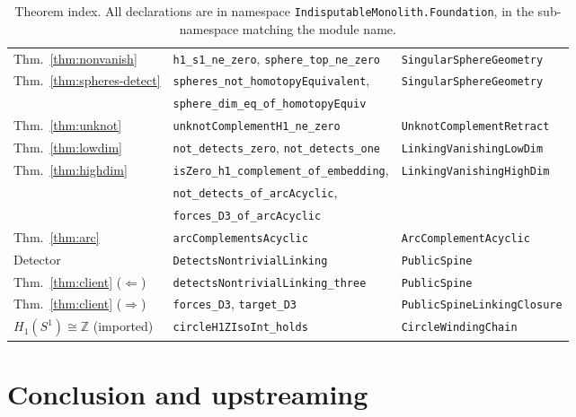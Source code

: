\documentclass[11pt]{article}
\theoremstyle{remark}
\newcommand{\Z}{\mathbb{Z}}
\newcommand{\leanname}[1]{\texttt{#1}}
\begin{document}
\begin{table}[ht]
\begin{tabular}{@{}lll@{}}
Thm.~\ref{thm:nonvanish} & \leanname{h1\_s1\_ne\_zero}, \leanname{sphere\_top\_ne\_zero} & \leanname{SingularSphereGeometry} \\
Thm.~\ref{thm:spheres-detect} & \leanname{spheres\_not\_homotopyEquivalent}, & \leanname{SingularSphereGeometry} \\
 & \leanname{sphere\_dim\_eq\_of\_homotopyEquiv} & \\
Thm.~\ref{thm:unknot} & \leanname{unknotComplementH1\_ne\_zero} & \leanname{UnknotComplementRetract} \\
Thm.~\ref{thm:lowdim} & \leanname{not\_detects\_zero}, \leanname{not\_detects\_one} & \leanname{LinkingVanishingLowDim} \\
Thm.~\ref{thm:highdim} & \leanname{isZero\_h1\_complement\_of\_embedding}, & \leanname{LinkingVanishingHighDim} \\
 & \leanname{not\_detects\_of\_arcAcyclic}, & \\
 & \leanname{forces\_D3\_of\_arcAcyclic} & \\
Thm.~\ref{thm:arc} & \leanname{arcComplementsAcyclic} & \leanname{ArcComplementAcyclic} \\
Detector & \leanname{DetectsNontrivialLinking} & \leanname{PublicSpine} \\
Thm.~\ref{thm:client} ($\Leftarrow$) & \leanname{detectsNontrivialLinking\_three} & \leanname{PublicSpine} \\
Thm.~\ref{thm:client} ($\Rightarrow$) & \leanname{forces\_D3}, \leanname{target\_D3} & \leanname{PublicSpineLinkingClosure} \\
$H_1(S^1)\cong\Z$ (imported) & \leanname{circleH1ZIsoInt\_holds} & \leanname{CircleWindingChain} \\
\bottomrule
\end{tabular}
\caption{Theorem index. All declarations are in namespace
\leanname{IndisputableMonolith.Foundation}, in the sub-namespace matching
the module name.}
\label{tab:index}
\end{table}

\section{Conclusion and upstreaming}\label{sec:conclusion}
\end{document}
